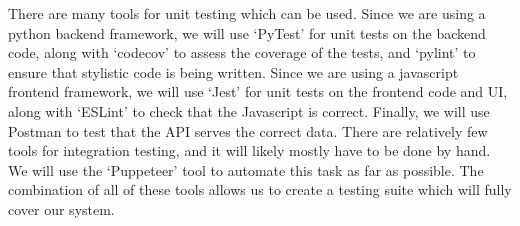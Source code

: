 \documentclass[10pt]{article}
\begin{document}
There are many tools for unit testing which can be used. Since we are using a
python backend framework, we will use `PyTest' for unit tests on the backend
code, along with `codecov' to assess the coverage of the tests, and `pylint' to
ensure that stylistic code is being written. Since we are using a javascript
frontend framework, we will use `Jest' for unit tests on the frontend code and
UI, along with `ESLint' to check that the Javascript is correct. Finally, we
will use Postman to test that the API serves the correct data. There are
relatively few tools for integration testing, and it will likely mostly have to
be done by hand. We will use the `Puppeteer' tool to automate this task as far
as possible. The combination of all of these tools allows us to create a testing
suite which will fully cover our system.




\end{document}
